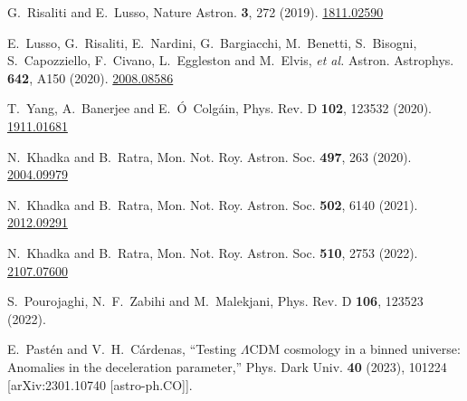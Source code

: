 \documentclass[a4paper,11pt]{article}
\begin{document}
\begin{thebibliography}{99}
G.~Risaliti and E.~Lusso,
Nature Astron. \textbf{3}, 272  (2019).
\href{https://arxiv.org/abs/1811.02590}{1811.02590}


E.~Lusso, G.~Risaliti, E.~Nardini, G.~Bargiacchi, M.~Benetti, S.~Bisogni, S.~Capozziello, F.~Civano, L.~Eggleston and M.~Elvis, \textit{et al.}
Astron. Astrophys. \textbf{642}, A150  (2020).
\href{https://arxiv.org/abs/2008.08586}{2008.08586}


T.~Yang, A.~Banerjee and E.~\'O~Colg\'ain,
Phys. Rev. D \textbf{102}, 123532  (2020).
\href{https://arxiv.org/abs/1911.01681}{1911.01681}


N.~Khadka and B.~Ratra,
Mon. Not. Roy. Astron. Soc. \textbf{497}, 263  (2020).
\href{https://arxiv.org/abs/2004.09979}{2004.09979}

N.~Khadka and B.~Ratra,
Mon. Not. Roy. Astron. Soc. \textbf{502}, 6140  (2021).
\href{https://arxiv.org/abs/2012.09291}{2012.09291}


N.~Khadka and B.~Ratra,
Mon. Not. Roy. Astron. Soc. \textbf{510}, 2753  (2022).
\href{https://arxiv.org/abs/2107.07600}{2107.07600}

S.~Pourojaghi, N.~F.~Zabihi and M.~Malekjani,
Phys. Rev. D \textbf{106}, 123523  (2022).

E.~Past\'en and V.~H.~C\'ardenas,
``Testing \ensuremath{\Lambda}CDM cosmology in a binned universe: Anomalies in the deceleration parameter,''
Phys. Dark Univ. \textbf{40} (2023), 101224
[arXiv:2301.10740 [astro-ph.CO]].


\end{thebibliography}
\end{document}
